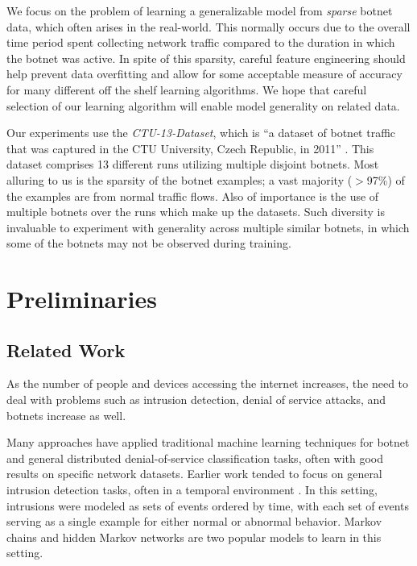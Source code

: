 \documentclass[letterpaper]{article}
\begin{document}
We focus on the problem of learning a generalizable model from \emph{sparse} botnet data, which often arises in the real-world.  This normally occurs due to the overall time period spent collecting network traffic compared to the duration in which the botnet was active.  In spite of this sparsity, careful feature engineering should help prevent data overfitting and allow for some acceptable measure of accuracy for many different off the shelf learning algorithms.  We hope that careful selection of our learning algorithm will enable model generality on related data.

Our experiments use the \emph{CTU-13-Dataset}, which is ``a dataset of botnet traffic that was captured in the CTU University, Czech Republic, in 2011'' \cite{garcia2014empirical}.  This dataset comprises 13 different runs utilizing multiple disjoint botnets.  Most alluring to us is the sparsity of the botnet examples; a vast majority ($>$97\%) of the examples are from normal traffic flows.  Also of importance is the use of multiple botnets over the runs which make up the datasets.  Such diversity is invaluable to experiment with generality across multiple similar botnets, in which some of the botnets may not be observed during training.

\section{Preliminaries}

\subsection{Related Work}

As the number of people and devices accessing the internet increases, the need to deal with problems such as intrusion detection, denial of service attacks, and botnets increase as well.

Many approaches have applied traditional machine learning techniques for botnet and general distributed denial-of-service classification tasks, often with good results on specific network datasets.  Earlier work tended to focus on general intrusion detection tasks, often in a temporal environment \cite{Ye00amarkov,1174909,Joshi:2005:IHM:1167350.1167387,Xu:2007:DDA:1763599.1763621}.  In this setting, intrusions were modeled as sets of events ordered by time, with each set of events serving as a single example for either normal or abnormal behavior. Markov chains and hidden Markov networks are two popular models to learn in this setting.
\end{document}
